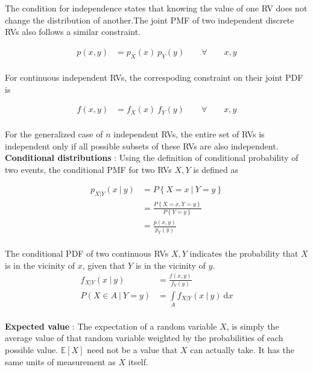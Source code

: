 The condition for independence states that knowing the value of one RV does not change the distribution of another.The joint PMF of two independent discrete RVs also follows a similar constraint.

\begin{align}
	p(x, y) &= p_X(x)\ p_Y(y) \qquad \forall \qquad x, y
\end{align} \\

For continuous independent RVs, the correspoding constraint on their joint PDF is

\begin{align}
	f(x, y) &= f_X(x)\ f_Y(y) \qquad \forall \qquad x, y
\end{align} \\

For the generalized case of $ n $ independent RVs, the entire set of RVs is independent only if all possible subsets of these RVs are also independent. \\

\textbf{Conditional distributions} : Using the definition of conditional probability of two events, the conditional PMF for two RVs $ X, Y $ is defined as 

\begin{align}
	p_{X|Y}(x\ |\ y) &= P \left\{ X = x\ |\ Y = y \right\} \nonumber\\
	&= \frac{P \left\{ X = x, Y = y \right\}}{P \left\{ Y = y \right\}} \nonumber\\
	&= \frac{p(x, y)}{p_Y(y)}
\end{align} \\

The conditional PDF of two continuous RVs $ X, Y $ indicates the probability that $ X $ is in the vicinity of $ x $, given that $ Y $ is in the vicinity of $ y $. \\

\begin{align}
	f_{X|Y}(x\ |\ y) &= \frac{f(x, y)}{f_Y(y)} \\
	P(X \in A\ |\ Y = y) &= \int\limits_{A} f_{X|Y}(x\ |\ y) \ \mathrm{d} x
\end{align}\\

\textbf{Expected value} : The expectation of a random variable $ X $, is simply the average value of that random variable weighted by the probabilities of each possible value. $ \mathbb{E}[X] $ need not be a value that $ X $ can actually take. It has the same units of measurement as $ X $ itself.\\

